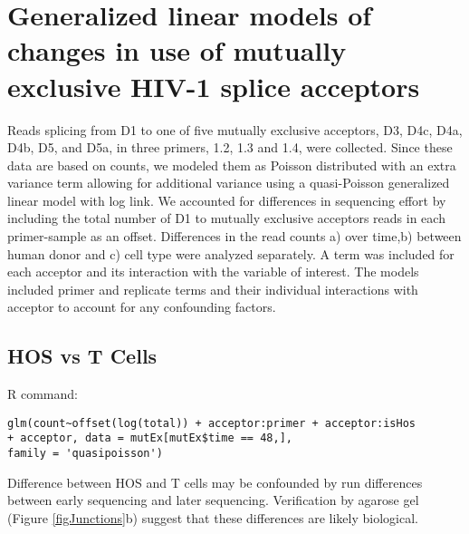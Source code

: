 \documentclass[../../sherrill-Mix_thesis.tex]{subfiles}
\begin{document}
\chapter{Generalized linear models of changes in use of mutually exclusive HIV-­1 splice acceptors}

\label{appPacbioReport}

Reads splicing from D1 to one of five mutually exclusive acceptors, D3, D4c, D4a, D4b, D5, and D5a, in three primers, 1.2, 1.3 and 1.4, were collected. Since these data are based on counts, we modeled them as Poisson distributed with an extra variance term allowing for additional variance using a quasi-Poisson generalized linear model with log link. We accounted for differences in sequencing effort by including the total number of D1 to mutually exclusive acceptors reads in each primer-sample as an offset. Differences in the read counts a) over time,b) between human donor and c) cell type were analyzed separately. A term was included for each acceptor and its interaction with the variable of interest. The models included primer and replicate terms and their individual interactions with acceptor to account for any confounding factors. 

\section{HOS vs T Cells}

R command:
\begin{lstlisting}[basicstyle=\ttfamily,breaklines=true]
glm(count~offset(log(total)) + acceptor:primer + acceptor:isHos
+ acceptor, data = mutEx[mutEx$time == 48,],
family = 'quasipoisson')
\end{lstlisting}

Difference between HOS and T cells may be confounded by run differences between early sequencing and later sequencing. Verification by agarose gel (Figure \ref{figJunctions}b) suggest that these differences are likely biological.

\end{document}
